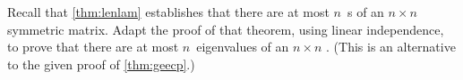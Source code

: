 \begin{exercise} \label{ex:lenlam} 
Recall that \cref{thm:lenlam} establishes that there are at most \(n\)~s of an \(n\times n\) symmetric matrix.
Adapt the proof of that theorem, using linear independence, to prove that there are at most \(n\)~eigenvalues of an \(n\times n\) .
(This is an alternative to the given proof of \cref{thm:geecp}.)
\end{exercise}




